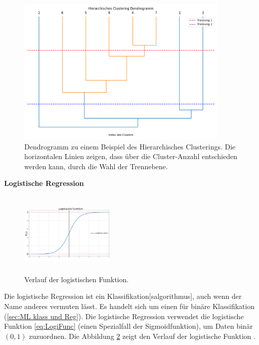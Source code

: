 \begin{figure}[htb]
    \centering
    \includegraphics[width=0.9\textwidth]{img/Plots/Dendogramm Hierachisches Clustering.png}
    \caption[Dendrogramm zu einem Beispiel des Hierarchisches Clusterings.]{Dendrogramm zu einem Beispiel des Hierarchisches Clusterings. Die horizontalen Linien zeigen, dass über die Cluster-Anzahl entschieden werden kann, durch die Wahl der Trennebene.}
    \label{fig:HiraClust}
\end{figure}

\dubpar
\textbf{Logistische Regression} \par
\begin{figure}
    \begin{center}
        \vspace*{-7mm}
        \includegraphics[width=0.4\textwidth, height=4cm]{img/Plots/Logistische Funktion.png}
        \vspace*{-10.5mm}
        \caption[Verlauf der logistischen Funktion.]{Verlauf der logistischen Funktion.}
        \label{fig:LogiFunc}
    \end{center}
\end{figure}
Die logistische Regression ist ein \gls{Klassifikation}[salgorithmus], auch wenn der Name anderes vermuten lässt. Es handelt sich um einen  für binäre \gls{Klassifikation} (\ref{sec:ML klass und Reg}). Die logistische Regression verwendet die logistische Funktion \ref{eq:LogiFunc} (einen Spezialfall der Sigmoidfunktion), um Daten binär \((0,1)\) zuzuordnen. Die Abbildung \ref{fig:LogiFunc} zeigt den Verlauf der logistische Funktion \cite{Burkov.2019}. 

